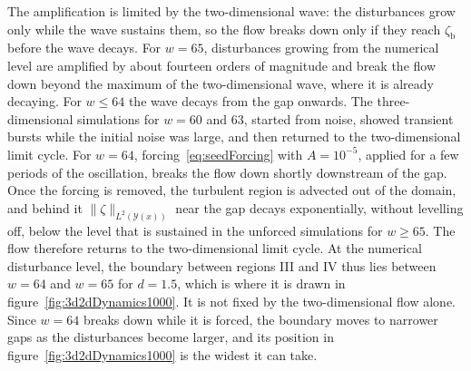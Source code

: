 \documentclass[lineno]{jfm}
\begin{document}
The amplification is limited by the two-dimensional wave: the disturbances grow only while the wave sustains them, so the flow breaks down only if they reach $\zeta_\mathrm{b}$ before the wave decays. For $w=65$, disturbances growing from the numerical level are amplified by about fourteen orders of magnitude and break the flow down beyond the maximum of the two-dimensional wave, where it is already decaying. For $w\leq64$ the wave decays from the gap onwards. The three-dimensional simulations for $w=60$ and $63$, started from noise, showed transient bursts while the initial noise was large, and then returned to the two-dimensional limit cycle. For $w=64$, forcing~\eqref{eq:seedForcing} with $A=10^{-5}$, applied for a few periods of the oscillation, breaks the flow down shortly downstream of the gap. Once the forcing is removed, the turbulent region is advected out of the domain, and behind it $\|\zeta\|_{L^2(\mathcal{Y}(x))}$ near the gap decays exponentially, without levelling off, below the level that is sustained in the unforced simulations for $w\geq65$. The flow therefore returns to the two-dimensional limit cycle. At the numerical disturbance level, the boundary between regions III and IV thus lies between $w=64$ and $w=65$ for $d=1.5$, which is where it is drawn in figure~\ref{fig:3d2dDynamics1000}. It is not fixed by the two-dimensional flow alone. Since $w=64$ breaks down while it is forced, the boundary moves to narrower gaps as the disturbances become larger, and its position in figure~\ref{fig:3d2dDynamics1000} is the widest it can take.
\end{document}
